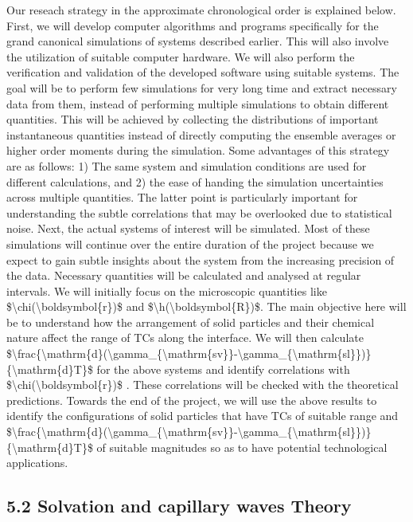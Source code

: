 \par Our reseach strategy in the approximate chronological order is explained below. First, we will develop computer algorithms and programs specifically for the grand canonical simulations of systems described earlier. This will also involve the utilization of suitable computer hardware. We will also perform the verification and validation of the developed software using suitable systems. The goal will be to perform few simulations for very long time and extract necessary data from them, instead of performing multiple simulations to obtain different quantities. This will be achieved by collecting the distributions of important instantaneous quantities instead of directly computing the ensemble averages or higher order moments during the simulation. Some advantages of this strategy are as follows: 1) The same system and simulation conditions are used for different calculations, and 2) the ease of handing the simulation uncertainties across multiple quantities. The latter point is particularly important for understanding the subtle correlations that may be overlooked due to statistical noise. Next, the actual systems of interest will be simulated. Most of these simulations will continue over the entire duration of the project because we expect to gain subtle insights about the system from the increasing precision of the data. Necessary quantities will be calculated and analysed at regular intervals. We will initially focus on the microscopic quantities like \$\textbackslash chi(\textbackslash boldsymbol\{r\})\$ and \$\textbackslash h(\textbackslash boldsymbol\{R\})\$. The main objective here will be to understand how the arrangement of solid particles and their chemical nature affect the range of TCs along the interface. We will then calculate \$\textbackslash frac\{\textbackslash mathrm\{d\}(\textbackslash gamma\_\{\textbackslash mathrm\{sv\}\}-\textbackslash gamma\_\{\textbackslash mathrm\{sl\}\})\}\{\textbackslash mathrm\{d\}T\}\$ for the above systems and identify correlations with \$\textbackslash chi(\textbackslash boldsymbol\{r\})\$ . These correlations will be checked with the theoretical predictions.  Towards the end of the project, we will use the above results to identify the configurations of solid particles that have TCs of suitable range and \$\textbackslash frac\{\textbackslash mathrm\{d\}(\textbackslash gamma\_\{\textbackslash mathrm\{sv\}\}-\textbackslash gamma\_\{\textbackslash mathrm\{sl\}\})\}\{\textbackslash mathrm\{d\}T\}\$ of suitable magnitudes so as to have potential technological applications.\subsection{5.2 Solvation and capillary waves Theory}

